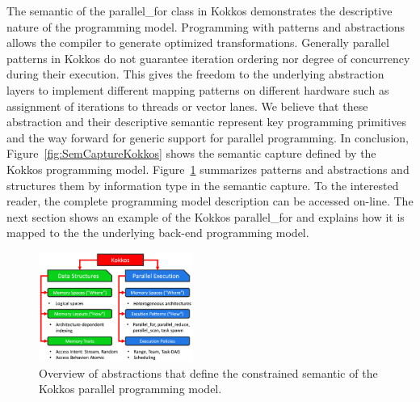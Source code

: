The semantic of the parallel\_for class in Kokkos demonstrates the descriptive nature of the programming model. Programming with patterns and abstractions allows the compiler to generate optimized transformations. 
Generally parallel patterns in Kokkos do not guarantee iteration ordering nor degree of concurrency during their execution. This gives the freedom to the underlying abstraction layers to implement different mapping patterns on different hardware such as assignment of iterations to threads or vector lanes. We believe that these abstraction and their descriptive semantic represent key programming primitives and the way forward for generic support for parallel programming. In conclusion, Figure~\ref{fig:SemCaptureKokkos} shows the semantic capture defined by the Kokkos programming model. Figure~\ref{fig:abstractions} summarizes patterns and abstractions and structures them by information type in the semantic capture. To the interested reader, the complete programming model description can be accessed on-line\cite{KOKKOS_WIKI}.
The next section shows an example of the Kokkos parallel\_for and explains how it is mapped to the the underlying back-end programming model.

\begin{figure}
\centerline{\includegraphics[width=0.45\textwidth]{img/Abstractions.png}}
\caption{Overview of abstractions that define the constrained semantic of the Kokkos parallel programming model.}
\label{fig:abstractions}
\end{figure}
